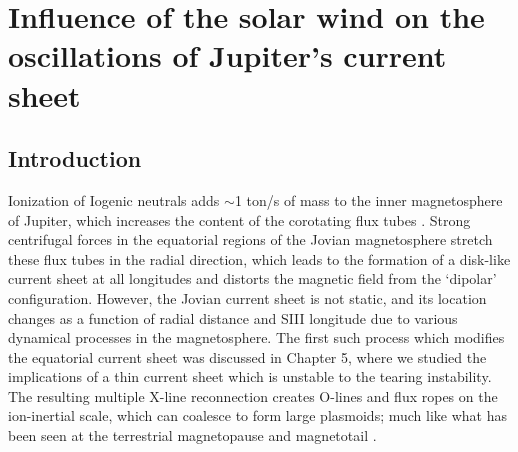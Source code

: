 \chapter{Influence of the solar wind on the oscillations of Jupiter's current sheet}

\section{Introduction}

Ionization of Iogenic neutrals adds  $\sim$1 ton/s of mass to the inner magnetosphere of Jupiter, which increases the content of the corotating flux tubes \cite{Bagenal2011b}. Strong centrifugal forces in the equatorial regions of the Jovian magnetosphere stretch these flux tubes in the radial direction, which leads to the formation of a disk-like current sheet at all longitudes \cite{Khurana2004a} and distorts the magnetic field from the `dipolar' configuration. However, the Jovian current sheet is not static, and its location changes as a function of radial distance and SIII longitude due to various dynamical processes in the magnetosphere. The first such process which modifies the equatorial current sheet was discussed in Chapter 5, where we studied the implications of a thin current sheet which is unstable to the tearing instability. The resulting multiple X-line reconnection creates O-lines and flux ropes on the ion-inertial scale, which can coalesce to form large plasmoids; much like what has been seen at the terrestrial magnetopause and magnetotail \cite{AkhavanTafti2020ComparativeEvents, Eastwood2005ObservationsStudy}.

